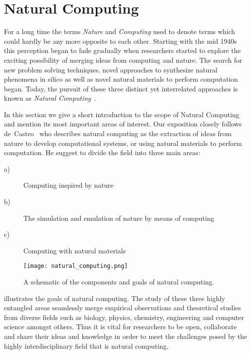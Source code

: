 \section{Natural Computing}

	For a long time the terms \emph{Nature} and \emph{Computing} used to denote terms which could hardly be any more opposite to each other. Starting with the mid 1940s this perception began to fade gradually when researchers started to explore the exciting possibility of merging ideas from computing and nature. The search for new problem solving techniques, novel approaches to synthesize natural phenomena in silico as well as novel natural materials to perform computation began. Today, the pursuit of these three distinct yet interrelated approaches is known as \emph{Natural Computing}~\cite{de2005natural,de2006fundamentals}.

	In this section we give a short introduction to the scope of Natural Computing and mention its most important areas of interest. Our exposition closely follows de~Castro~\cite{de2007fundamentals} who describes natural computing as the extraction of ideas from nature to develop computational systems, or using natural materials to perform computation. He suggest to divide the field into three main areas:

	\begin{description}
		\item[a)] Computing inspired by nature
		\item[b)] The simulation and emulation of nature by means of computing
		\item[c)] Computing with natural materials
	\end{description}

	\begin{figure}
			\centering
			\texttt{[image: natural\_computing.png]}
			\caption[The goals of natural computing.]{A schematic of the components and goals of natural computing.}
			\label{fig:natural_computing}
	\end{figure}

	 illustrates the goals of natural computing. The study of these three highly entangled areas seamlessly merge empirical observations and theoretical studies from diverse fields such as biology, physics, chemistry, engineering and computer science amongst others. Thus it is vital for researchers to be open, collaborate and share their ideas and knowledge in order to meet the challenges posed by the highly interdisciplinary field that is natural computing.